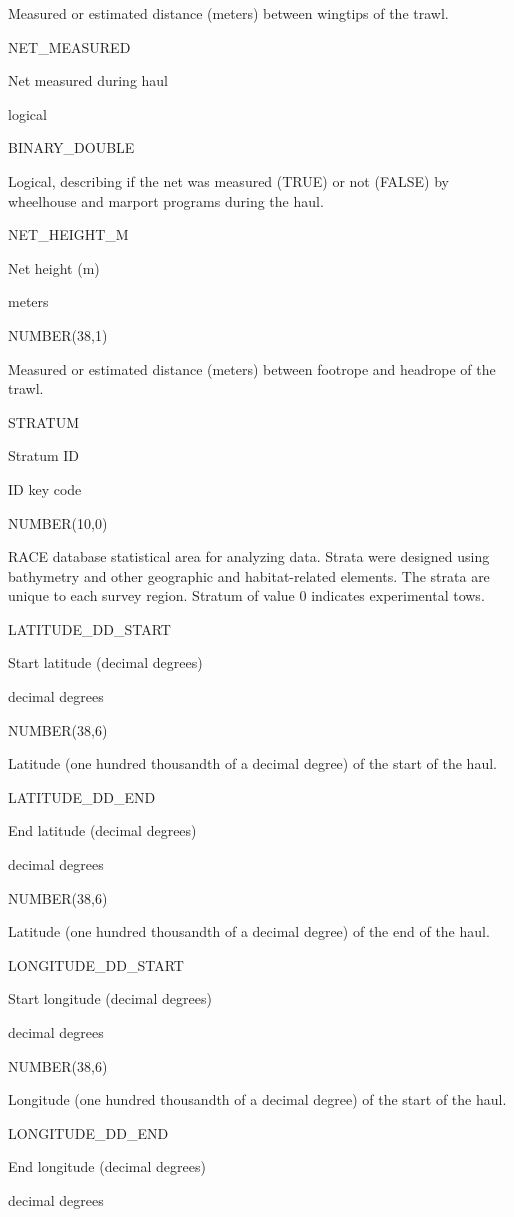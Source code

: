 \documentclass[
  letterpaper,
  oneside,
  open=any]{scrbook}
\begin{document}
Measured or estimated distance (meters) between wingtips of the trawl.

NET\_MEASURED

Net measured during haul

logical

BINARY\_DOUBLE

Logical, describing if the net was measured (TRUE) or not (FALSE) by
wheelhouse and marport programs during the haul.

NET\_HEIGHT\_M

Net height (m)

meters

NUMBER(38,1)

Measured or estimated distance (meters) between footrope and headrope of
the trawl.

STRATUM

Stratum ID

ID key code

NUMBER(10,0)

RACE database statistical area for analyzing data. Strata were designed
using bathymetry and other geographic and habitat-related elements. The
strata are unique to each survey region. Stratum of value 0 indicates
experimental tows.

LATITUDE\_DD\_START

Start latitude (decimal degrees)

decimal degrees

NUMBER(38,6)

Latitude (one hundred thousandth of a decimal degree) of the start of
the haul.

LATITUDE\_DD\_END

End latitude (decimal degrees)

decimal degrees

NUMBER(38,6)

Latitude (one hundred thousandth of a decimal degree) of the end of the
haul.

LONGITUDE\_DD\_START

Start longitude (decimal degrees)

decimal degrees

NUMBER(38,6)

Longitude (one hundred thousandth of a decimal degree) of the start of
the haul.

LONGITUDE\_DD\_END

End longitude (decimal degrees)

decimal degrees
\end{document}

